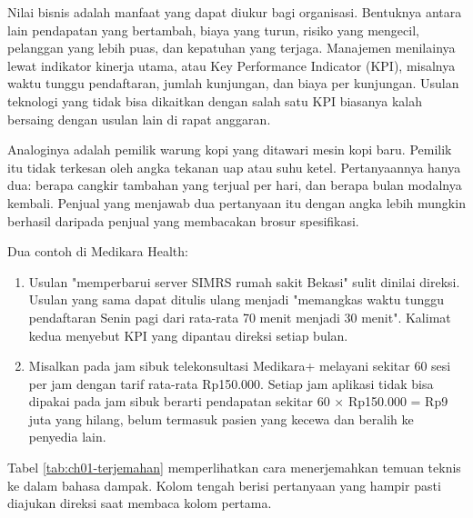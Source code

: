 Nilai bisnis adalah manfaat yang dapat diukur bagi organisasi. Bentuknya antara lain
pendapatan yang bertambah, biaya yang turun, risiko yang mengecil, pelanggan yang lebih
puas, dan kepatuhan yang terjaga. Manajemen menilainya lewat indikator kinerja utama,
atau Key Performance Indicator (KPI), misalnya waktu tunggu pendaftaran, jumlah
kunjungan, dan biaya per kunjungan. Usulan teknologi yang tidak bisa dikaitkan dengan
salah satu KPI biasanya kalah bersaing dengan usulan lain di rapat anggaran.

Analoginya adalah pemilik warung kopi yang ditawari mesin kopi baru. Pemilik itu tidak
terkesan oleh angka tekanan uap atau suhu ketel. Pertanyaannya hanya dua: berapa cangkir
tambahan yang terjual per hari, dan berapa bulan modalnya kembali. Penjual yang menjawab
dua pertanyaan itu dengan angka lebih mungkin berhasil daripada penjual yang membacakan
brosur spesifikasi.

Dua contoh di Medikara Health:
\begin{enumerate}
  \item Usulan "memperbarui server SIMRS rumah sakit Bekasi" sulit dinilai direksi.
        Usulan yang sama dapat ditulis ulang menjadi "memangkas waktu tunggu pendaftaran
        Senin pagi dari rata-rata 70 menit menjadi 30 menit". Kalimat kedua menyebut KPI
        yang dipantau direksi setiap bulan.
  \item Misalkan pada jam sibuk telekonsultasi Medikara+ melayani sekitar 60 sesi per
        jam dengan tarif rata-rata Rp150.000. Setiap jam aplikasi tidak bisa dipakai pada
        jam sibuk berarti pendapatan sekitar 60 × Rp150.000 = Rp9 juta yang hilang,
        belum termasuk pasien yang kecewa dan beralih ke penyedia lain.
\end{enumerate}

Tabel \ref{tab:ch01-terjemahan} memperlihatkan cara menerjemahkan temuan teknis ke dalam
bahasa dampak. Kolom tengah berisi pertanyaan yang hampir pasti diajukan direksi saat
membaca kolom pertama.

